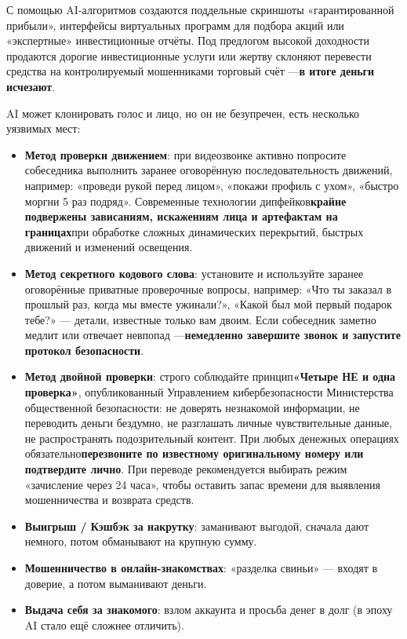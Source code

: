 С помощью AI-алгоритмов создаются поддельные скриншоты «гарантированной прибыли», интерфейсы виртуальных программ для подбора акций или «экспертные» инвестиционные отчёты. Под предлогом высокой доходности продаются дорогие инвестиционные услуги или жертву склоняют перевести средства на контролируемый мошенниками торговый счёт —\textbf{в итоге деньги исчезают}.


AI может клонировать голос и лицо, но он не безупречен, есть несколько уязвимых мест:

\begin{itemize}
  \item \textbf{Метод проверки движением}: при видеозвонке активно попросите собеседника выполнить заранее оговорённую последовательность движений, например: «проведи рукой перед лицом», «покажи профиль с ухом», «быстро моргни 5 раз подряд». Современные технологии дипфейков\textbf{крайне подвержены зависаниям, искажениям лица и артефактам на границах}при обработке сложных динамических перекрытий, быстрых движений и изменений освещения.
  \item \textbf{Метод секретного кодового слова}: установите и используйте заранее оговорённые приватные проверочные вопросы, например: «Что ты заказал в прошлый раз, когда мы вместе ужинали?», «Какой был мой первый подарок тебе?» — детали, известные только вам двоим. Если собеседник заметно медлит или отвечает невпопад —\textbf{немедленно завершите звонок и запустите протокол безопасности}.
  \item \textbf{Метод двойной проверки}: строго соблюдайте принцип\textbf{«Четыре НЕ и одна проверка»}, опубликованный Управлением кибербезопасности Министерства общественной безопасности: не доверять незнакомой информации, не переводить деньги бездумно, не разглашать личные чувствительные данные, не распространять подозрительный контент. При любых денежных операциях обязательно\textbf{перезвоните по известному оригинальному номеру или подтвердите лично}. При переводе рекомендуется выбирать режим «зачисление через 24 часа», чтобы оставить запас времени для выявления мошенничества и возврата средств.
\end{itemize}


\begin{itemize}
  \item \textbf{Выигрыш / Кэшбэк за накрутку}: заманивают выгодой, сначала дают немного, потом обманывают на крупную сумму.
  \item \textbf{Мошенничество в онлайн-знакомствах}: «разделка свиньи» — входят в доверие, а потом выманивают деньги.
  \item \textbf{Выдача себя за знакомого}: взлом аккаунта и просьба денег в долг (в эпоху AI стало ещё сложнее отличить).
\end{itemize}

